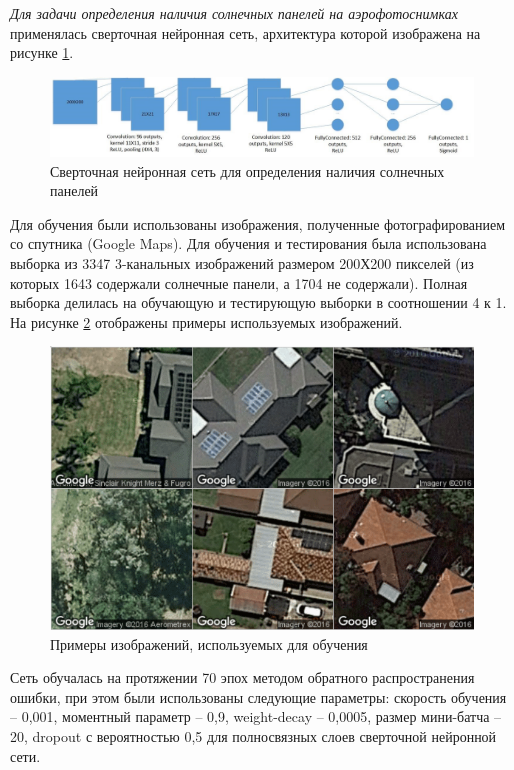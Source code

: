 \documentclass{thesisby}
\begin{document}
\textit{Для задачи определения наличия солнечных панелей на аэрофотоснимках} применялась сверточная нейронная сеть, архитектура которой изображена на рисунке \ref{fig:used_cnn}.
 
\begin{figure}[ht]
	\centering
	\includegraphics[width=17cm]{man-source/images/ch4/pic4-19.jpg}
	\caption{Сверточная нейронная сеть для определения наличия солнечных панелей}
	\label{fig:used_cnn}
\end{figure}

Для обучения были использованы изображения, полученные фотографированием со спутника (Google Maps). Для обучения и тестирования была использована выборка из 3347 3-канальных изображений размером 200Х200 пикселей (из которых 1643 содержали солнечные панели, а 1704 не содержали). Полная выборка делилась на обучающую и тестирующую выборки в соотношении 4 к 1. На рисунке \ref{fig:google_maps} отображены примеры используемых изображений.
 
\begin{figure}[ht]
	\centering
	\includegraphics[width=12cm]{man-source/images/ch4/pic4-17.png}
	\caption{Примеры изображений, используемых для обучения}
	\label{fig:google_maps}
\end{figure}

Сеть обучалась на протяжении 70 эпох методом обратного распространения ошибки, при этом были использованы следующие параметры: скорость обучения -- 0,001, моментный параметр -- 0,9, weight-decay -- 0,0005, размер мини-батча -- 20, dropout с вероятностью 0,5 для полносвязных слоев сверточной нейронной сети.
	
\end{document}
